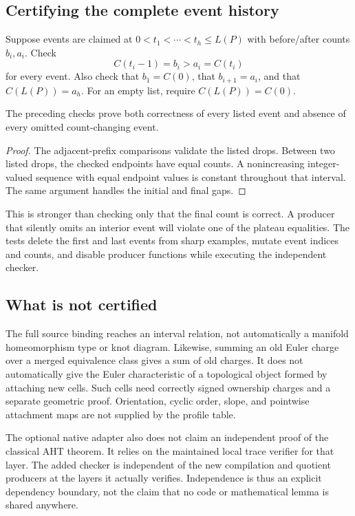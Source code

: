 \subsection{Certifying the complete event history}

Suppose events are claimed at
$0<t_1<\cdots<t_h\le L(P)$ with before/after counts $b_i,a_i$. Check
\[
 C(t_i-1)=b_i>a_i=C(t_i)
\]
for every event. Also check that $b_1=C(0)$, that $b_{i+1}=a_i$, and that
$C(L(P))=a_h$. For an empty list, require $C(L(P))=C(0)$.

\begin{proposition}
\label{prop:history-cert}
The preceding checks prove both correctness of every listed event and
absence of every omitted count-changing event.
\end{proposition}

\begin{proof}
The adjacent-prefix comparisons validate the listed drops. Between two
listed drops, the checked endpoints have equal counts. A nonincreasing
integer-valued sequence with equal endpoint values is constant throughout
that interval. The same argument handles the initial and final gaps.
\end{proof}

This is stronger than checking only that the final count is correct. A
producer that silently omits an interior event will violate one of the
plateau equalities. The tests delete the first and last events from sharp
examples, mutate event indices and counts, and disable producer functions
while executing the independent checker.

\subsection{What is not certified}

The full source binding reaches an interval relation, not automatically a
manifold homeomorphism type or knot diagram. Likewise, summing an old Euler
charge over a merged equivalence class gives a sum of old charges. It does
not automatically give the Euler characteristic of a topological object
formed by attaching new cells. Such cells need correctly signed ownership
charges and a separate geometric proof. Orientation, cyclic order, slope,
and pointwise attachment maps are not supplied by the profile table.

The optional native adapter also does not claim an independent proof of the
classical AHT theorem. It relies on the maintained local trace verifier for
that layer. The added checker is independent of the new compilation and
quotient producers at the layers it actually verifies. Independence is thus
an explicit dependency boundary, not the claim that no code or mathematical
lemma is shared anywhere.

